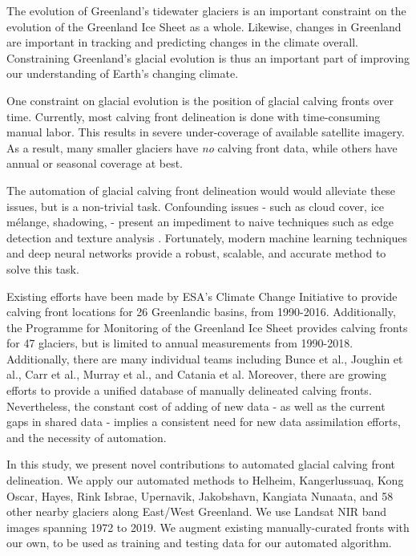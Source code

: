 \documentclass[tc, manuscript]{copernicus}
\begin{document}
\introduction
The evolution of Greenland's tidewater glaciers is an important constraint on the evolution of the Greenland Ice Sheet as a whole. Likewise, changes in Greenland are important in tracking and predicting changes in the climate overall. Constraining Greenland's glacial evolution is thus an important part of improving our understanding of Earth's changing climate.

One constraint on glacial evolution is the position of glacial calving fronts over time. Currently, most calving front delineation is done with time-consuming manual labor. This results in severe under-coverage of available satellite imagery. As a result, many smaller glaciers have {\em no} calving front data, while others have annual or seasonal coverage at best.

The automation of glacial calving front delineation would would alleviate these issues, but is a non-trivial task. Confounding issues - such as cloud cover, ice mélange, shadowing,  - present an impediment to naive techniques such as edge detection \citep{paravolidakis2016} and texture analysis \citep{malik2001}. Fortunately, modern machine learning techniques and deep neural networks provide a robust, scalable, and accurate method to solve this task.

Existing efforts have been made by ESA's Climate Change Initiative to provide calving front locations for 26 Greenlandic basins, from 1990-2016\citep{enveo2017}. Additionally, the Programme for Monitoring of the Greenland Ice Sheet provides calving fronts for 47 glaciers, but is limited to annual measurements from 1990-2018\citep{andersen2019}. Additionally, there are many individual teams including Bunce et al., Joughin et al., Carr et al., Murray et al., and Catania et al. Moreover, there are growing efforts to provide a unified database of manually delineated calving fronts. Nevertheless, the constant cost of adding of new data - as well as the current gaps in shared data - implies a consistent need for new data assimilation efforts, and the necessity of automation.

In this study, we present novel contributions to automated glacial calving front delineation. We apply our automated methods to Helheim, Kangerlussuaq, Kong Oscar, Hayes, Rink Isbrae, Upernavik, Jakobshavn, Kangiata Nunaata, and 58 other nearby glaciers along East/West Greenland. We use Landsat NIR band images spanning 1972 to 2019. We augment existing manually-curated fronts with our own, to be used as training and testing data for our automated algorithm.
\end{document}
